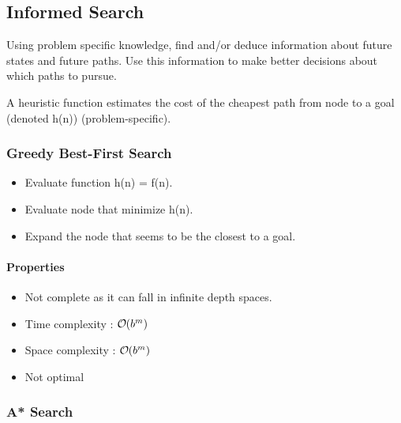 \subsection{Informed Search}

Using problem specific knowledge, find and/or deduce information about future states and future paths. Use this information to make better decisions about which paths to pursue.

A heuristic function estimates the cost of the cheapest path from node to a goal (denoted h(n)) (problem-specific).

\subsubsection{Greedy Best-First Search}

\begin{itemize}
\item Evaluate function h(n) = f(n).
\item Evaluate node that minimize h(n).
\item Expand the node that seems to be the closest to a goal.
\end{itemize}

\paragraph{Properties}
\begin{itemize}
\item Not complete as it can fall in infinite depth spaces.
\item Time complexity : $\bigO (b^m)$
\item Space complexity : $\bigO (b^m)$
\item Not optimal
\end{itemize}

\newpage
\subsubsection{A* Search}

